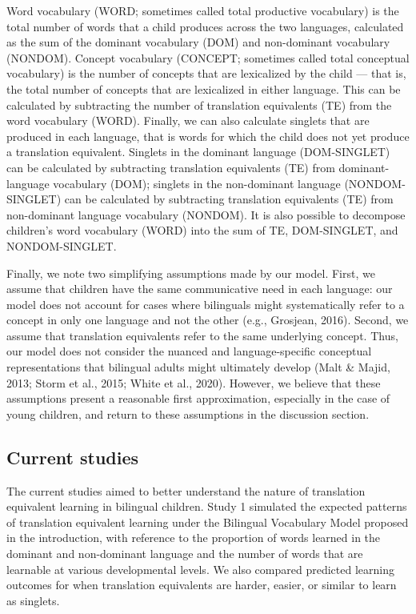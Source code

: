 \documentclass[
  english,
  ,man,floatsintext]{apa6}
\begin{document}
Word vocabulary (WORD; sometimes called total productive vocabulary) is the total number of words that a child produces across the two languages, calculated as the sum of the dominant vocabulary (DOM) and non-dominant vocabulary (NONDOM). Concept vocabulary (CONCEPT; sometimes called total conceptual vocabulary) is the number of concepts that are lexicalized by the child --- that is, the total number of concepts that are lexicalized in either language. This can be calculated by subtracting the number of translation equivalents (TE) from the word vocabulary (WORD). Finally, we can also calculate singlets that are produced in each language, that is words for which the child does not yet produce a translation equivalent. Singlets in the dominant language (DOM-SINGLET) can be calculated by subtracting translation equivalents (TE) from dominant-language vocabulary (DOM); singlets in the non-dominant language (NONDOM-SINGLET) can be calculated by subtracting translation equivalents (TE) from non-dominant language vocabulary (NONDOM). It is also possible to decompose children's word vocabulary (WORD) into the sum of TE, DOM-SINGLET, and NONDOM-SINGLET.

Finally, we note two simplifying assumptions made by our model. First, we assume that children have the same communicative need in each language: our model does not account for cases where bilinguals might systematically refer to a concept in only one language and not the other (e.g., Grosjean, 2016). Second, we assume that translation equivalents refer to the same underlying concept. Thus, our model does not consider the nuanced and language-specific conceptual representations that bilingual adults might ultimately develop (Malt \& Majid, 2013; Storm et al., 2015; White et al., 2020). However, we believe that these assumptions present a reasonable first approximation, especially in the case of young children, and return to these assumptions in the discussion section.

\hypertarget{current-studies}{%
\subsection{Current studies}\label{current-studies}}

The current studies aimed to better understand the nature of translation equivalent learning in bilingual children. Study 1 simulated the expected patterns of translation equivalent learning under the Bilingual Vocabulary Model proposed in the introduction, with reference to the proportion of words learned in the dominant and non-dominant language and the number of words that are learnable at various developmental levels. We also compared predicted learning outcomes for when translation equivalents are harder, easier, or similar to learn as singlets.
\end{document}
